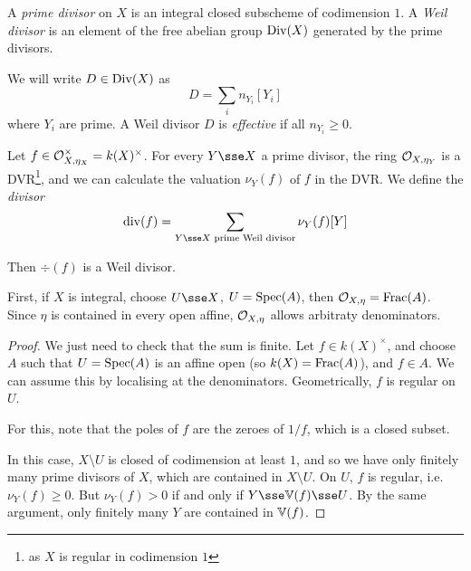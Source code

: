 \documentclass{article}
\begin{document}
\begin{definition}
    A \emph{prime divisor} on \(X\) is an integral closed subscheme of codimension \(1\). A \emph{Weil divisor} is an element of the free abelian group \(\operatorname{Div}(X)\) generated by the prime divisors.
\end{definition}

We will write \(D \in \operatorname{Div}(X)\) as
\[D = \sum_i n_{Y_i}[Y_i]\]
where \(Y_i\) are prime. A Weil divisor \(D\) is \emph{effective} if all \(n_{Y_i} \ge 0\).

\begin{proposition}
    Let \(f \in \mathcal{O}_{X, \eta_X}^\times = k(X)^\times\). For every \(Y \sse X\) a prime divisor, the ring \(\mathcal{O}_{X, \eta_Y}\) is a DVR\footnote{as \(X\) is regular in codimension \(1\)}, and we can calculate the valuation \(\nu_Y(f)\) of \(f\) in the DVR. We define the \emph{divisor}
    \[\div(f) = \sum_{Y \sse X \text{ prime Weil divisor}}\nu_Y(f)[Y]\]
    
    Then \(\div(f)\) is a Weil divisor.
\end{proposition}

First, if \(X\) is integral, choose \(U \sse X\), \(U = \operatorname{Spec}(A)\), then \(\mathcal{O}_{X,\eta} = \operatorname{Frac}(A)\). Since \(\eta\) is contained in every open affine, \(\mathcal{O}_{X, \eta}\) allows arbitraty denominators.

\lec

\begin{proof}
    We just need to check that the sum is finite. Let \(f \in k(X)^\times\), and choose \(A\) such that \(U = \operatorname{Spec}(A)\) is an affine open (so \(k(X) = \operatorname{Frac}(A)\)), and \(f \in A\). We can assume this by localising at the denominators. Geometrically, \(f\) is regular on \(U\). \begin{addendum}
        For this, note that the poles of \(f\) are the zeroes of \(1/f\), which is a closed subset.
    \end{addendum}

    In this case, \(X \setminus U\) is closed of codimension at least \(1\), and so we have only finitely many prime divisors of \(X\), which are contained in \(X \setminus U\). On \(U\), \(f\) is regular, i.e. \(\nu_Y(f)\ge 0\). But \(\nu_Y(f) > 0\) if and only if \(Y \sse \van(f) \sse U\). By the same argument, only finitely many \(Y\) are contained in \(\mathbb{V}(f)\).
\end{proof}
\end{document}
